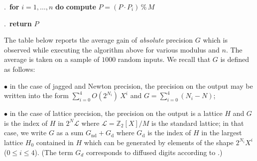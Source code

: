\documentclass{sig-alternate-2013}
\newcommand{\Z}{\mathbb Z}
\renewcommand{\mod}{\,\%\,}
\begin{document}
.\ {\bf for} $i=1,\dots,n$ {\bf do} {\bf compute} $P = (P 
\cdot P_i) \mod M$

.\ {\bf return} $P$

\vspace{-1ex}\noindent\hrulefill

\medskip

The table below reports the average gain of \emph{absolute} 
precision $G$ which is observed while executing the algorithm above 
for various modulus and $n$. The average is taken on a sample of $1000$ 
random inputs. We recall that $G$ is defined as follows:

\noindent $\bullet$
in the case of jagged and Newton precision, the precision on the output 
may be written into the form $\sum_{i=0}^4 O(2^{N_i}) \: X^i$ and 
$G = \sum_{i=0}^4 (N_i - N)$;

\noindent $\bullet$
in the case of lattice precision, the precision on the output is a 
lattice $H$ and $G$ is the index of $H$ in $2^N \mathcal L$ where 
$\mathcal L = \Z_2[X]/M$ is the standard lattice; in that case, we write 
$G$ as a sum $G_{\text{nd}} + G_{\text{d}}$ where $G_{\text{d}}$ is the 
index of $H$ in the largest lattice $H_0$ contained in $H$ which can be 
generated by elements of the shape $2^{N_i} X^i$ ($0 \leq i \leq 4$). 
(The term $G_d$ corresponds to diffused digits according to 
\cite[Definition 2.3]{preclinalg}.)

\medskip
\end{document}
